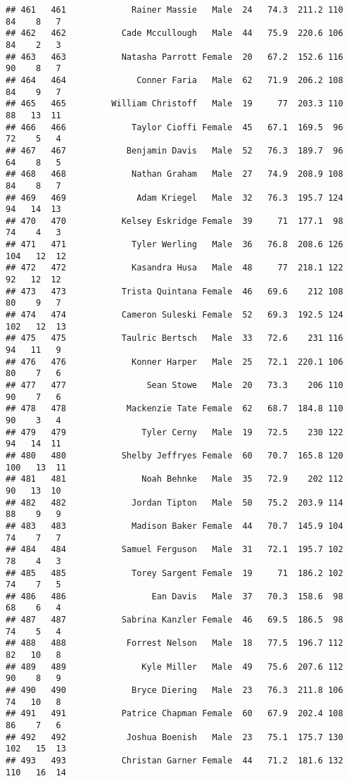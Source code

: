 \documentclass[
]{article}
\begin{document}
\begin{verbatim}
## 461   461             Rainer Massie   Male  24   74.3  211.2 110  84    8   7
## 462   462           Cade Mccullough   Male  44   75.9  220.6 106  84    2   3
## 463   463           Natasha Parrott Female  20   67.2  152.6 116  90    8   7
## 464   464              Conner Faria   Male  62   71.9  206.2 108  84    9   7
## 465   465         William Christoff   Male  19     77  203.3 110  88   13  11
## 466   466             Taylor Cioffi Female  45   67.1  169.5  96  72    5   4
## 467   467            Benjamin Davis   Male  52   76.3  189.7  96  64    8   5
## 468   468             Nathan Graham   Male  27   74.9  208.9 108  84    8   7
## 469   469              Adam Kriegel   Male  32   76.3  195.7 124  94   14  13
## 470   470           Kelsey Eskridge Female  39     71  177.1  98  74    4   3
## 471   471             Tyler Werling   Male  36   76.8  208.6 126 104   12  12
## 472   472             Kasandra Husa   Male  48     77  218.1 122  92   12  12
## 473   473           Trista Quintana Female  46   69.6    212 108  80    9   7
## 474   474           Cameron Suleski Female  52   69.3  192.5 124 102   12  13
## 475   475           Taulric Bertsch   Male  33   72.6    231 116  94   11   9
## 476   476             Konner Harper   Male  25   72.1  220.1 106  80    7   6
## 477   477                Sean Stowe   Male  20   73.3    206 110  90    7   6
## 478   478            Mackenzie Tate Female  62   68.7  184.8 110  90    3   4
## 479   479               Tyler Cerny   Male  19   72.5    230 122  94   14  11
## 480   480           Shelby Jeffryes Female  60   70.7  165.8 120 100   13  11
## 481   481               Noah Behnke   Male  35   72.9    202 112  90   13  10
## 482   482             Jordan Tipton   Male  50   75.2  203.9 114  88    9   9
## 483   483             Madison Baker Female  44   70.7  145.9 104  74    7   7
## 484   484           Samuel Ferguson   Male  31   72.1  195.7 102  78    4   3
## 485   485             Torey Sargent Female  19     71  186.2 102  74    7   5
## 486   486                 Ean Davis   Male  37   70.3  158.6  98  68    6   4
## 487   487           Sabrina Kanzler Female  46   69.5  186.5  98  74    5   4
## 488   488            Forrest Nelson   Male  18   77.5  196.7 112  82   10   8
## 489   489               Kyle Miller   Male  49   75.6  207.6 112  90    8   9
## 490   490             Bryce Diering   Male  23   76.3  211.8 106  74   10   8
## 491   491           Patrice Chapman Female  60   67.9  202.4 108  86    7   6
## 492   492            Joshua Boenish   Male  23   75.1  175.7 130 102   15  13
## 493   493           Christan Garner Female  44   71.2  181.6 132 110   16  14

\end{verbatim}
\end{document}
